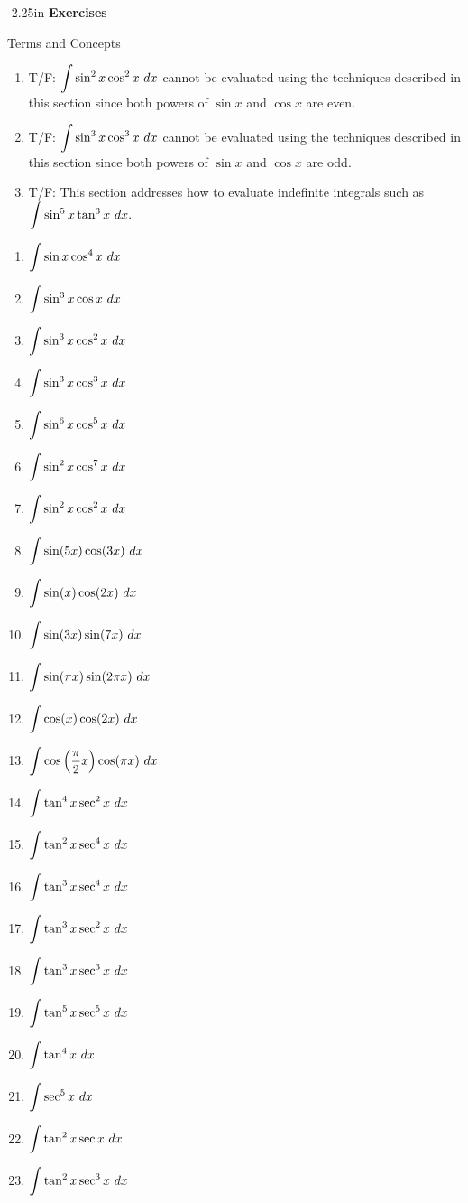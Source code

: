 \begin{adjustwidth*}{}{-2.25in}
\textbf{{\large Exercises}}
\setlength{\columnsep}{25pt}
\begin{multicols*}{2}
\noindent Terms and Concepts \small
\begin{enumerate}[1)]
\item T/F: $\ds \int \sin^2x\cos^2x \ dx$ cannot be evaluated using the techniques described in this section since both powers of $\sin x$ and $\cos x$ are even.
\item T/F: $\ds \int \sin^3x\cos^3x \ dx$ cannot be evaluated using the techniques described in this section since both powers of $\sin x$ and $\cos x$ are odd.
\item T/F: This section addresses how to evaluate indefinite integrals such as $\ds \int \sin^5x\tan^3x\ dx.$
\end{enumerate} 

 \small


\begin{enumerate}[1),resume]
\item $\ds \int \sin x\cos^4x\ dx$
\item $\ds \int \sin^3 x\cos x\ dx$
\item $\ds \int \sin^3 x\cos^2 x\ dx$
\item $\ds \int \sin^3 x\cos^3 x\ dx$
\item $\ds \int \sin^6 x\cos^5 x\ dx$
\item $\ds \int \sin^2 x\cos^7 x\ dx$
\item $\ds \int \sin^2 x\cos^2 x\ dx$
\item $\ds \int \sin(5x)\cos(3x)\ dx$
\item $\ds \int \sin(x)\cos(2x)\ dx$
\item $\ds \int \sin(3x)\sin(7x)\ dx$
\item $\ds \int \sin(\pi x)\sin(2\pi x)\ dx$
\item $\ds \int \cos(x)\cos(2x)\ dx$
\item $\displaystyle \int \cos\left(\frac{\pi}{2} x\right)\cos(\pi x)\ dx$
\item $\ds \int \tan^4x\sec^2x\ dx$
\item $\ds \int \tan^2x\sec^4x\ dx$
\item $\ds \int \tan^3x\sec^4x\ dx$
\item $\ds \int \tan^3x\sec^2x\ dx$
\item $\ds \int \tan^3x\sec^3x\ dx$
\item $\ds \int \tan^5x\sec^5x\ dx$
\item $\displaystyle \int \tan^4x\ dx$
\item $\displaystyle \int \sec^5x\ dx$
\item $\ds \int \tan^2x\sec x\ dx$
\item $\ds \int \tan^2x\sec^3x\ dx$
\end{enumerate}


\end{multicols*}
\end{adjustwidth*}
